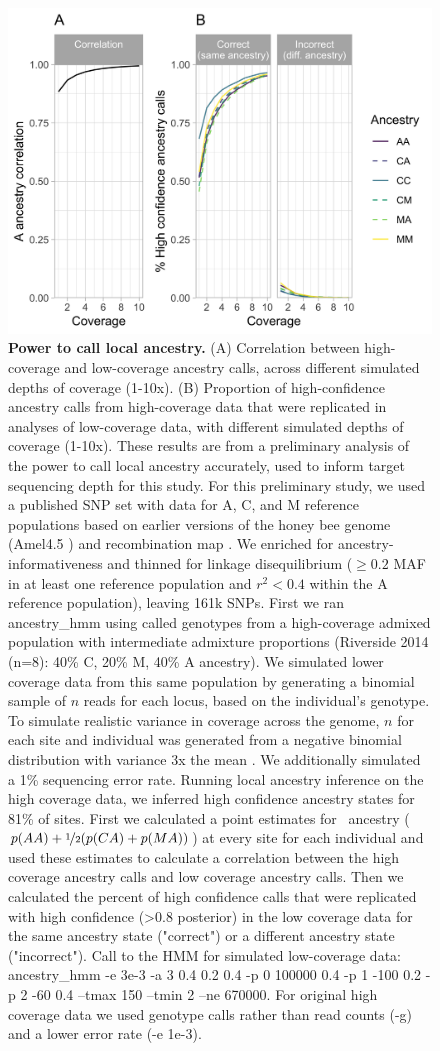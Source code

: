 \begin{figure}[ht]
\includegraphics[width=.6\textwidth]{chapter1/figures/sims_downsample.png}
\caption{ \textbf{Power to call local ancestry.} (A) Correlation between high-coverage and low-coverage ancestry calls, across different simulated depths of coverage (1-10x). (B) Proportion of high-confidence ancestry calls from high-coverage data that were replicated in analyses of low-coverage data, with different simulated depths of coverage (1-10x). These results are from a preliminary analysis of the power to call local ancestry accurately, used to inform target sequencing depth for this study. For this preliminary study, we used a published SNP set with data for A, C, and M reference populations \cite{Cridland:2017el} based on earlier versions of the honey bee genome (Amel4.5 \cite{SequencingConsortium:2006ce}) and recombination map \cite{Wallberg:2014ha}. We enriched for ancestry-informativeness and thinned for linkage disequilibrium ($\geq 0.2$ MAF in at least one reference population and $r^2 < 0.4$ within the A reference population), leaving 161k SNPs. First we ran ancestry\_hmm \cite{CorbettDetig:2017gh} using called genotypes from a high-coverage admixed population with intermediate admixture proportions (Riverside 2014 (n=8): 40\% C, 20\% M, 40\% A ancestry). We simulated lower coverage data from this same population by generating a binomial sample of $n$ reads for each locus, based on the individual's genotype. To simulate realistic variance in coverage across the genome, $n$ for each site and individual was generated from a negative binomial distribution with variance 3x the mean \cite{Miller:2011en}. We additionally simulated a 1\% sequencing error rate. Running local ancestry inference on the high coverage data, we inferred high confidence ancestry states for 81\% of sites. First we calculated a point estimates for \A\  ancestry ($p(AA) + \nicefrac{1}{2}(p(CA) + p(MA))$) at every site for each individual and used these estimates to calculate a correlation between the high coverage ancestry calls and low coverage ancestry calls. Then we calculated the percent of high confidence calls that were replicated with high confidence (\textgreater 0.8 posterior) in the low coverage data for the same ancestry state ("correct") or a different ancestry state ("incorrect"). Call to the HMM for simulated low-coverage data: ancestry\_hmm -e 3e-3 -a 3 0.4 0.2 0.4 -p 0 100000 0.4 -p 1 -100 0.2 -p 2 -60 0.4 --tmax 150 --tmin 2 --ne 670000. For original high coverage data we used genotype calls rather than read counts (-g) and a lower error rate (-e 1e-3).}

\label{sims_downsample}
\end{figure}

